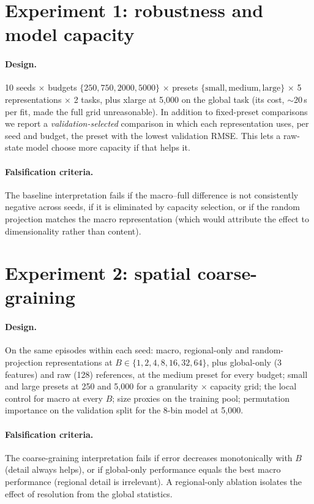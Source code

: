 \documentclass[11pt,a4paper]{article}
\begin{document}
\section{Experiment 1: robustness and model capacity}

\paragraph{Design.}
10 seeds $\times$ budgets $\{250,750,2000,5000\}$ $\times$ presets
$\{\text{small},\text{medium},\text{large}\}$ $\times$ 5 representations
$\times$ 2 tasks, plus xlarge at 5,000 on the global task (its cost,
$\sim$20\,s per fit, made the full grid unreasonable). In addition to
fixed-preset comparisons we report a \emph{validation-selected} comparison in
which each representation uses, per seed and budget, the preset with the lowest
validation RMSE. This lets a raw-state model choose more capacity if that helps
it.

\paragraph{Falsification criteria.}
The baseline interpretation fails if the macro--full difference is not
consistently negative across seeds, if it is eliminated by capacity selection,
or if the random projection matches the macro representation (which would
attribute the effect to dimensionality rather than content).

\section{Experiment 2: spatial coarse-graining}

\paragraph{Design.}
On the same episodes within each seed: macro, regional-only and
random-projection representations at $B\in\{1,2,4,8,16,32,64\}$, plus
global-only (3 features) and raw (128) references, at the medium preset for
every budget; small and large presets at 250 and 5,000 for a granularity
$\times$ capacity grid; the local control for macro at every $B$; size proxies
on the training pool; permutation importance on the validation split for the
8-bin model at 5,000.

\paragraph{Falsification criteria.}
The coarse-graining interpretation fails if error decreases monotonically with
$B$ (detail always helps), or if global-only performance equals the best macro
performance (regional detail is irrelevant). A regional-only ablation isolates
the effect of resolution from the global statistics.
\end{document}
